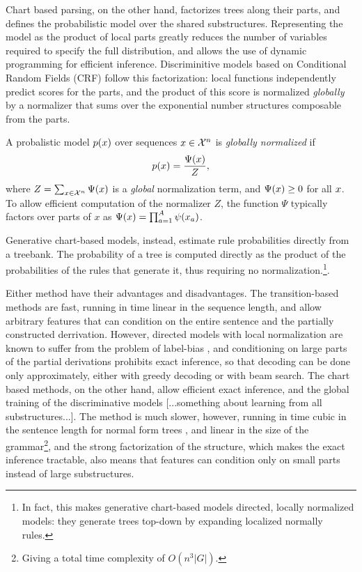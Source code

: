     Chart based parsing, on the other hand, factorizes trees along their parts, and defines the probabilistic model over the shared substructures. Representing the model as the product of local parts greatly reduces the number of variables required to specify the full distribution, and allows the use of dynamic programming for efficient inference. Discriminitive models based on Conditional Random Fields (CRF) \citep{lafferty2001crf} follow this factorization: local functions independently predict scores for the parts, and the product of this score is normalized \textit{globally} by a normalizer that sums over the exponential number structures composable from the parts.
    \begin{definition}{}
      A probalistic model $p(x)$ over sequences $x \in \mathcal{X}^n$ is \textit{globally normalized} if
      \begin{align*}
        p(x) = \frac{ \Psi( x ) }{ Z },
      \end{align*}
      where $Z  = \sum_{x \in \mathcal{X}^n} \Psi( x )$ is a \textit{global} normalization term, and $\Psi (x ) \geq 0$ for all $x$. To allow efficient computation of the normalizer $Z$, the function $\Psi$ typically factors over parts of $x$ as $\Psi ( x ) = \prod_{a=1}^A \psi (x_a )$.
    \end{definition}
    Generative chart-based models, instead, estimate rule probabilities directly from a treebank. The probability of a tree is computed directly as the product of the probabilities of the rules that generate it, thus requiring no normalization.\footnote{In fact, this makes generative chart-based models directed, locally normalized models: they generate trees top-down by expanding localized normally rules.}.

    Either method have their advantages and disadvantages. The transition-based methods are fast, running in time linear in the sequence length, and allow arbitrary features that can condition on the entire sentence and the partially constructed derrivation. However, directed models with local normalization are known to suffer from the problem of label-bias \citep{lafferty2001crf}, and conditioning on large parts of the partial derivations prohibits exact inference, so that decoding can be done only approximately, either with greedy decoding or with beam search. The chart based methods, on the other hand, allow efficient exact inference, and the global training of the discriminative models [...something about learning from all substructures...]. The method is much slower, however, running in time cubic in the sentence length for normal form trees , and linear in the size of the grammar\footnote{Giving a total time complexity of $O(n^3|G|)$.}, and the strong factorization of the structure, which makes the exact inference tractable, also means that features can condition only on small parts instead of large substructures.

